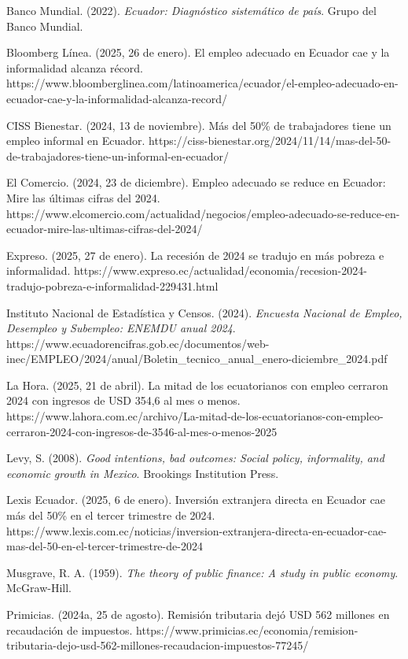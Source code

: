 \documentclass[12pt,spanish]{article}
\begin{document}
Banco Mundial. (2022). \emph{Ecuador: Diagnóstico sistemático de país}.
Grupo del Banco Mundial.

Bloomberg Línea. (2025, 26 de enero). El empleo adecuado en Ecuador cae
y la informalidad alcanza récord.
https://www.bloomberglinea.com/latinoamerica/ecuador/el-empleo-adecuado-en-ecuador-cae-y-la-informalidad-alcanza-record/

CISS Bienestar. (2024, 13 de noviembre). Más del 50\% de trabajadores
tiene un empleo informal en Ecuador.
https://ciss-bienestar.org/2024/11/14/mas-del-50-de-trabajadores-tiene-un-informal-en-ecuador/

El Comercio. (2024, 23 de diciembre). Empleo adecuado se reduce en
Ecuador: Mire las últimas cifras del 2024.
https://www.elcomercio.com/actualidad/negocios/empleo-adecuado-se-reduce-en-ecuador-mire-las-ultimas-cifras-del-2024/

Expreso. (2025, 27 de enero). La recesión de 2024 se tradujo en más
pobreza e informalidad.
https://www.expreso.ec/actualidad/economia/recesion-2024-tradujo-pobreza-e-informalidad-229431.html

Instituto Nacional de Estadística y Censos. (2024). \emph{Encuesta
Nacional de Empleo, Desempleo y Subempleo: ENEMDU anual 2024}.
https://www.ecuadorencifras.gob.ec/documentos/web-inec/EMPLEO/2024/anual/Boletin\_tecnico\_anual\_enero-diciembre\_2024.pdf

La Hora. (2025, 21 de abril). La mitad de los ecuatorianos con empleo
cerraron 2024 con ingresos de USD 354,6 al mes o menos.
https://www.lahora.com.ec/archivo/La-mitad-de-los-ecuatorianos-con-empleo-cerraron-2024-con-ingresos-de-3546-al-mes-o-menos-2025

Levy, S. (2008). \emph{Good intentions, bad outcomes: Social policy,
informality, and economic growth in Mexico}. Brookings Institution
Press.

Lexis Ecuador. (2025, 6 de enero). Inversión extranjera directa en
Ecuador cae más del 50\% en el tercer trimestre de 2024.
https://www.lexis.com.ec/noticias/inversion-extranjera-directa-en-ecuador-cae-mas-del-50-en-el-tercer-trimestre-de-2024

Musgrave, R. A. (1959). \emph{The theory of public finance: A study in
public economy}. McGraw-Hill.

Primicias. (2024a, 25 de agosto). Remisión tributaria dejó USD 562
millones en recaudación de impuestos.
https://www.primicias.ec/economia/remision-tributaria-dejo-usd-562-millones-recaudacion-impuestos-77245/
\end{document}
